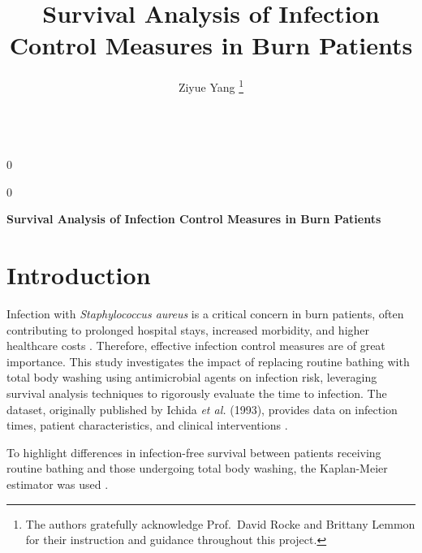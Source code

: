 \documentclass[12pt]{article}
\newcommand{\blind}{0}
\begin{document}
\def\spacingset#1{\renewcommand{\baselinestretch}%
{#1}\small\normalsize} \spacingset{1}



\blind
{
  \title{\bf Survival Analysis of Infection Control Measures in Burn
Patients}

  \author{
        Ziyue Yang \thanks{The authors gratefully acknowledge
Prof.~David Rocke and Brittany Lemmon for their instruction and guidance
throughout this project.} \\
    \\
      }
  \maketitle
} \fi

\blind
{
  \bigskip
  \bigskip
  \bigskip
  \begin{center}
    {\LARGE\bf Survival Analysis of Infection Control Measures in Burn
Patients}
  \end{center}
  \medskip
} \fi

\bigskip

\noindent%
 

\vfill

\newpage
\spacingset{1.9} %

\section{Introduction}\label{introduction}

Infection with \emph{Staphylococcus aureus} is a critical concern in
burn patients, often contributing to prolonged hospital stays, increased
morbidity, and higher healthcare costs \citep{norbury_infection_2016}.
Therefore, effective infection control measures are of great importance.
This study investigates the impact of replacing routine bathing with
total body washing using antimicrobial agents on infection risk,
leveraging survival analysis techniques to rigorously evaluate the time
to infection. The dataset, originally published by Ichida \emph{et al.}
(1993), provides data on infection times, patient characteristics, and
clinical interventions \citep{ichida_evaluation_1993}.

To highlight differences in infection-free survival between patients
receiving routine bathing and those undergoing total body washing, the
Kaplan-Meier estimator was used \citep{kaplan_nonparametric_1958}.
\end{document}

